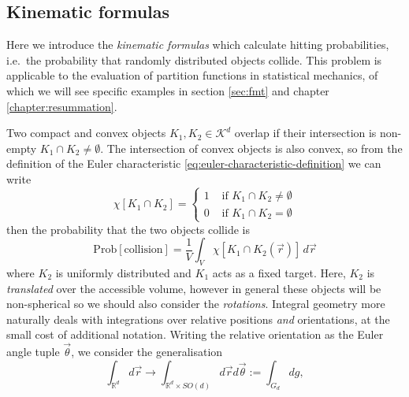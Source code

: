 \subsection{Kinematic formulas}
\label{sec:kinematic-formula}

Here we introduce the \emph{kinematic formulas} which calculate hitting probabilities, i.e.\ the probability that randomly distributed objects collide.
This problem is applicable to the evaluation of partition functions in statistical mechanics, of which we will see specific examples in section \ref{sec:fmt} and chapter \ref{chapter:resummation}.

Two compact and convex objects $K_1, K_2 \in \mathcal{K}^d$ overlap if their intersection is non-empty $K_1 \cap K_2 \ne \emptyset$.
The intersection of convex objects is also convex, so from the definition of the Euler characteristic \eqref{eq:euler-characteristic-definition} we can write
\begin{equation*}
  \chi[K_1 \cap K_2]
  =
  \begin{cases}
    1 & \textrm{ if } K_1 \cap K_2 \ne \emptyset \\
    0 & \textrm{ if } K_1 \cap K_2 = \emptyset
  \end{cases}
\end{equation*}
then the probability that the two objects collide is
\begin{equation*}
  \mathrm{Prob} \left[ \textrm{collision} \right]
  =
  \frac{1}{V} \int_V \chi[K_1 \cap K_2(\vec{r})] \, d\vec{r}
\end{equation*}
where $K_2$ is uniformly distributed and $K_1$ acts as a fixed target.
Here, $K_2$ is \emph{translated} over the accessible volume, however in general these objects will be non-spherical so we should also consider the \emph{rotations}.
Integral geometry more naturally deals with integrations over relative positions \emph{and} orientations, at the small cost of additional notation.
Writing the relative orientation as the Euler angle tuple $\vec{\theta}$, we consider the generalisation
\begin{equation*}
  \int_{\mathbb{R}^d} d\vec{r}
  \to
  \int_{\mathbb{R}^d \times SO(d)} d\vec{r} d\vec{\theta}
  :=
  \int_{G_d} dg,
\end{equation*}
